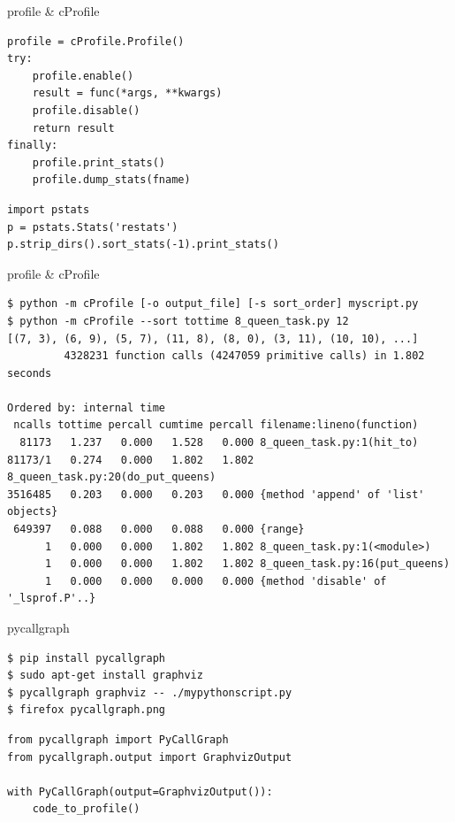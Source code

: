 \documentclass{article}
\begin{document}
\begin{center} profile \& cProfile \end{center}
\begin{lstlisting}
profile = cProfile.Profile()
try:
    profile.enable()
    result = func(*args, **kwargs)
    profile.disable()
    return result
finally:
    profile.print_stats()
    profile.dump_stats(fname)
\end{lstlisting}

\begin{lstlisting}
import pstats
p = pstats.Stats('restats')
p.strip_dirs().sort_stats(-1).print_stats()
\end{lstlisting}
\newpage

\begin{center} profile \& cProfile \end{center}
\large
\begin{verbatim}
$ python -m cProfile [-o output_file] [-s sort_order] myscript.py
$ python -m cProfile --sort tottime 8_queen_task.py 12
[(7, 3), (6, 9), (5, 7), (11, 8), (8, 0), (3, 11), (10, 10), ...]
         4328231 function calls (4247059 primitive calls) in 1.802 seconds

Ordered by: internal time
 ncalls tottime percall cumtime percall filename:lineno(function)
  81173   1.237   0.000   1.528   0.000 8_queen_task.py:1(hit_to)
81173/1   0.274   0.000   1.802   1.802 8_queen_task.py:20(do_put_queens)
3516485   0.203   0.000   0.203   0.000 {method 'append' of 'list' objects}
 649397   0.088   0.000   0.088   0.000 {range}
      1   0.000   0.000   1.802   1.802 8_queen_task.py:1(<module>)
      1   0.000   0.000   1.802   1.802 8_queen_task.py:16(put_queens)
      1   0.000   0.000   0.000   0.000 {method 'disable' of '_lsprof.P'..}
\end{verbatim}
\LARGE
\newpage

\begin{center} pycallgraph \end{center}
\begin{verbatim}
$ pip install pycallgraph
$ sudo apt-get install graphviz
$ pycallgraph graphviz -- ./mypythonscript.py
$ firefox pycallgraph.png
\end{verbatim}

\begin{lstlisting}
from pycallgraph import PyCallGraph
from pycallgraph.output import GraphvizOutput

with PyCallGraph(output=GraphvizOutput()):
    code_to_profile()
\end{lstlisting}
\newpage
\end{document}
